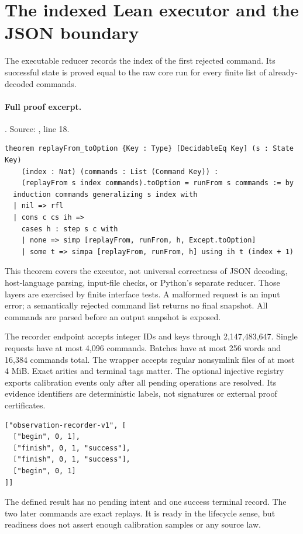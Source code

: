 \documentclass[11pt]{article}
\begin{document}
\section{The indexed Lean executor and the JSON boundary}
The executable reducer records the index of the first rejected command. Its
successful state is proved equal to the raw core run for every finite list of
already-decoded commands.

\paragraph{Full proof excerpt.}. Source: , line 18.
\begin{lstlisting}[style=AVOCSource]
theorem replayFrom_toOption {Key : Type} [DecidableEq Key] (s : State Key)
    (index : Nat) (commands : List (Command Key)) :
    (replayFrom s index commands).toOption = runFrom s commands := by
  induction commands generalizing s index with
  | nil => rfl
  | cons c cs ih =>
    cases h : step s c with
    | none => simp [replayFrom, runFrom, h, Except.toOption]
    | some t => simpa [replayFrom, runFrom, h] using ih t (index + 1)
\end{lstlisting}


This theorem covers the executor, not universal correctness of JSON decoding,
host-language parsing, input-file checks, or Python's separate reducer. Those
layers are exercised by finite interface tests. A malformed request is an
input error; a semantically rejected command list returns no final snapshot.
All commands are parsed before an output snapshot is exposed.

The recorder endpoint accepts integer IDs and keys through 2,147,483,647.
Single requests have at most 4,096 commands. Batches have at most 256 words
and 16,384 commands total. The wrapper accepts regular nonsymlink files of at
most 4 MiB. Exact arities and terminal tags matter. The optional injective
registry exports calibration events only after all pending operations are
resolved. Its evidence identifiers are deterministic labels, not signatures
or external proof certificates.

\begin{lstlisting}[style=LeanCode]
["observation-recorder-v1", [
  ["begin", 0, 1],
  ["finish", 0, 1, "success"],
  ["finish", 0, 1, "success"],
  ["begin", 0, 1]
]]
\end{lstlisting}
The defined result has no pending intent and one success terminal record. The
two later commands are exact replays. It is ready in the lifecycle sense, but
readiness does not assert enough calibration samples or any source law.
\end{document}
